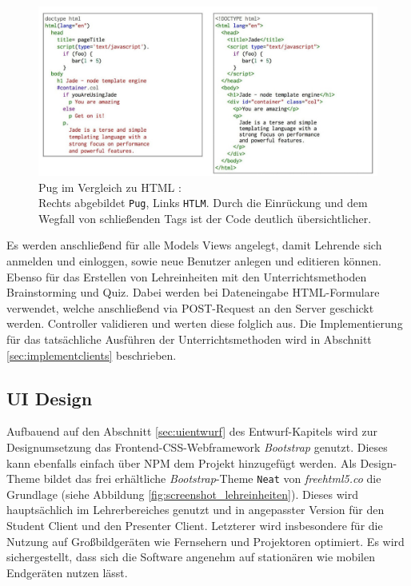 \begin{figure}[h!]
	\centering
	\includegraphics[width=1\linewidth]{bilder/pug}
	\caption[Pug im Vergleich zu HTML]{Pug im Vergleich zu HTML \cite{Janschltz2015}:\\Rechts abgebildet \texttt{Pug}, Links \texttt{HTLM}. Durch die Einrückung und dem Wegfall von schließenden Tags ist der Code deutlich übersichtlicher.}
	\label{fig:pug}
\end{figure}


 
Es werden anschließend für alle Models Views angelegt, damit Lehrende sich anmelden und einloggen, sowie neue Benutzer anlegen und editieren können. Ebenso für das Erstellen von Lehreinheiten mit den Unterrichtsmethoden Brainstorming und Quiz. Dabei werden bei Dateneingabe HTML-Formulare verwendet, welche anschließend via POST-Request an den Server geschickt werden. Controller validieren und werten diese folglich aus. Die Implementierung für das tatsächliche Ausführen der Unterrichtsmethoden wird in Abschnitt \ref{sec:implementclients} beschrieben. 

\subsection{UI Design}\label{sec:uidesign}
Aufbauend auf den Abschnitt \ref{sec:uientwurf} des Entwurf-Kapitels wird zur Designumsetzung das Frontend-CSS-Webframework \emph{Bootstrap} \cite{Twitter2019} genutzt. Dieses kann ebenfalls einfach über NPM dem Projekt hinzugefügt werden. Als Design-Theme bildet das frei erhältliche \emph{Bootstrap}-Theme \texttt{Neat} von \emph{freehtml5.co} die Grundlage (siehe Abbildung \ref{fig:screenshot_lehreinheiten}). Dieses wird hauptsächlich im Lehrerbereiches genutzt und in angepasster Version für den Student Client und den Presenter Client. Letzterer wird insbesondere für die Nutzung auf Großbildgeräten wie Fernsehern und Projektoren optimiert. Es wird sichergestellt, dass sich die Software angenehm auf stationären wie mobilen Endgeräten nutzen lässt. 

